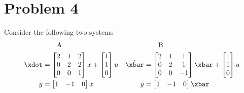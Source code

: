 \documentclass[10pt]{article}
\begin{document}
\section{Problem 4}
Consider the following two systems
\begin{align*}
      &\qquad \text{A} && \qquad\text{B}\\
      \xdot &=
      \begin{bmatrix}
        2 & 1 & 2 \\ 0 & 2 & 2\\ 0 & 0 & 1
      \end{bmatrix} x +
      \begin{bmatrix}
        1 \\ 1 \\ 0
      \end{bmatrix}u
      & \dot{\xbar} &=
      \begin{bmatrix}
        2 & 1 & 1 \\ 0 & 2 & 1 \\ 0 & 0 & -1
      \end{bmatrix}\xbar + 
      \begin{bmatrix}
        1 \\ 1 \\ 0
      \end{bmatrix}u\\
      y &=
      \begin{bmatrix}
        1 & -1 & 0
      \end{bmatrix}x 
      & y&=
      \begin{bmatrix}
        1 & -1 & 0
      \end{bmatrix}\xbar
\end{align*}
\end{document}
